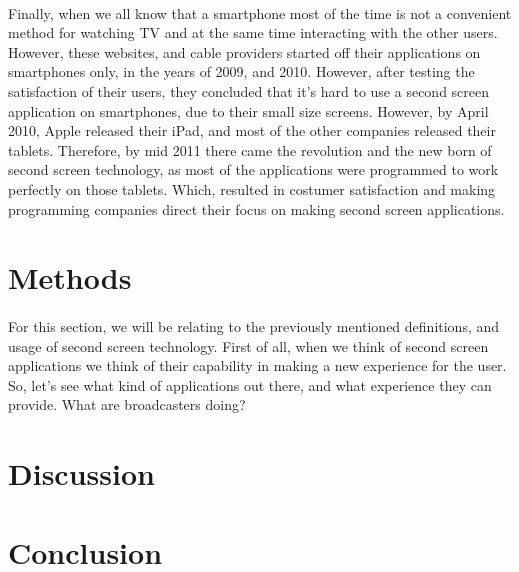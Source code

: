 \documentclass[12pt, oneside]{article}   	%
\begin{document}
 \paragraph{}
 Finally, when we all know that a smartphone most of the time is not a convenient method for watching TV and at the same time interacting with the other users.  However, these websites, and cable providers started off their applications on smartphones only, in the years of 2009, and 2010.  However, after testing the satisfaction of their users, they concluded that it's hard to use a second screen application on smartphones, due to their small size screens.  However, by April 2010, Apple released their iPad, and most of the other companies released their tablets.  Therefore, by mid 2011 there came the revolution and the new born of second screen technology, as most of the applications were programmed to work perfectly on those tablets.  Which, resulted in costumer satisfaction and making programming companies direct their focus on making second screen applications.
 \section{Methods} 
 \paragraph{}
For this section, we will be relating to the previously mentioned definitions, and usage of second screen technology. First of all, when we think of second screen applications we think of their capability in making a new  experience for the user.  So, let's see what kind of applications out there, and what experience they can provide.    What are broadcasters doing? \cite{Second-Screen-Art}
 \section{Discussion}
 \section{Conclusion}


 
 

 
 
\end{document}
